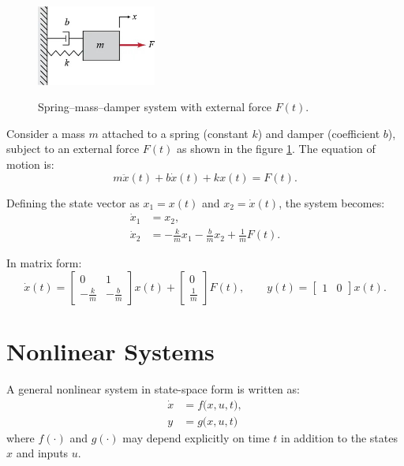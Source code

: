 \begin{example}

\begin{figure}[h!]
    \centering
    \includegraphics[width=0.35\textwidth]{Images/nonlinear/introduction/mass_spring_damper.jpg}
    \label{fig:spring}
    \caption{Spring–mass–damper system with external force $F(t)$.}
\end{figure}

Consider a mass $m$ attached to a spring (constant $k$) and damper (coefficient $b$), subject to an external force $F(t)$ as shown in the figure \ref{fig:spring}.  
The equation of motion is:
\begin{equation}
    m\ddot{x}(t) + b\dot{x}(t) + kx(t) = F(t).
\end{equation}

Defining the state vector as $x_1 = x(t)$ and $x_2 = \dot{x}(t)$, the system becomes:
\begin{align}
    \dot{x}_1 &= x_2, \\
    \dot{x}_2 &= -\tfrac{k}{m}x_1 - \tfrac{b}{m}x_2 + \tfrac{1}{m}F(t).
\end{align}

In matrix form:
\begin{equation}
\dot{x}(t) =
\begin{bmatrix}
0 & 1 \\
-\tfrac{k}{m} & -\tfrac{b}{m}
\end{bmatrix} x(t) +
\begin{bmatrix}
0 \\ \tfrac{1}{m}
\end{bmatrix} F(t),
\qquad
y(t) =
\begin{bmatrix}
1 & 0
\end{bmatrix} x(t).
\end{equation}
\end{example}

\section{Nonlinear Systems}
\begin{definition}
A general nonlinear system in state-space form is written as:
\begin{align}
    \dot{x} &= f\big(x,u,t\big), \\
    y &= g\big(x,u,t\big)
\end{align}
where $f(\cdot)$ and $g(\cdot)$ may depend explicitly on time $t$ in addition to the states $x$ and inputs $u$.
\end{definition}

